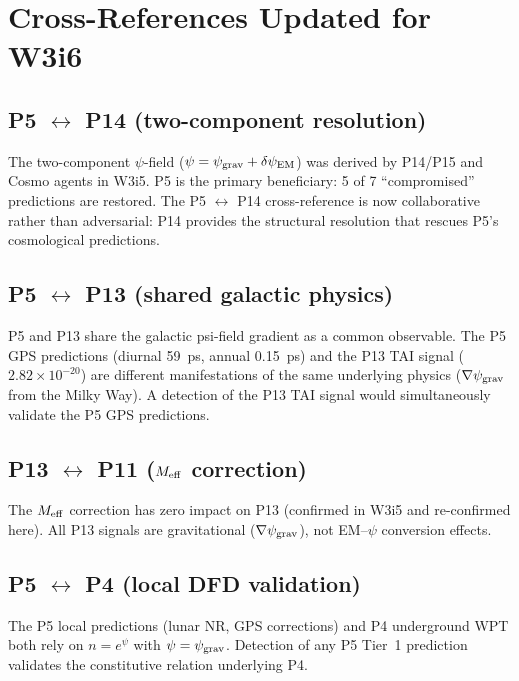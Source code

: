 \documentclass[11pt]{article}
\newcommand{\ee}[1]{\times 10^{#1}}
\newcommand{\psigrav}{\psi_{\rm grav}}
\newcommand{\dpsiEM}{\delta\psi_{\rm EM}}
\newcommand{\Meff}{M_{\rm eff}}
\begin{document}
\section{Cross-References Updated for W3i6}
\label{sec:xrefs}

\subsection{P5 $\leftrightarrow$ P14 (two-component resolution)}

The two-component $\psi$-field ($\psi = \psigrav + \dpsiEM$) was
derived by P14/P15 and Cosmo agents in W3i5. P5 is the primary
beneficiary: 5 of 7 ``compromised'' predictions are restored. The
P5 $\leftrightarrow$ P14 cross-reference is now collaborative rather
than adversarial: P14 provides the structural resolution that rescues
P5's cosmological predictions.

\subsection{P5 $\leftrightarrow$ P13 (shared galactic physics)}

P5 and P13 share the galactic psi-field gradient as a common
observable. The P5 GPS predictions (diurnal 59~ps, annual 0.15~ps)
and the P13 TAI signal ($2.82\ee{-20}$) are different manifestations
of the same underlying physics ($\nabla\psigrav$ from the Milky Way).
A detection of the P13 TAI signal would simultaneously validate the
P5 GPS predictions.

\subsection{P13 $\leftrightarrow$ P11 ($\Meff$ correction)}

The $\Meff$ correction has zero impact on P13 (confirmed in W3i5 and
re-confirmed here). All P13 signals are gravitational ($\nabla\psigrav$),
not EM--$\psi$ conversion effects.

\subsection{P5 $\leftrightarrow$ P4 (local DFD validation)}

The P5 local predictions (lunar NR, GPS corrections) and P4 underground
WPT both rely on $n = e^\psi$ with $\psi = \psigrav$. Detection of
any P5 Tier~1 prediction validates the constitutive relation underlying P4.
\end{document}

